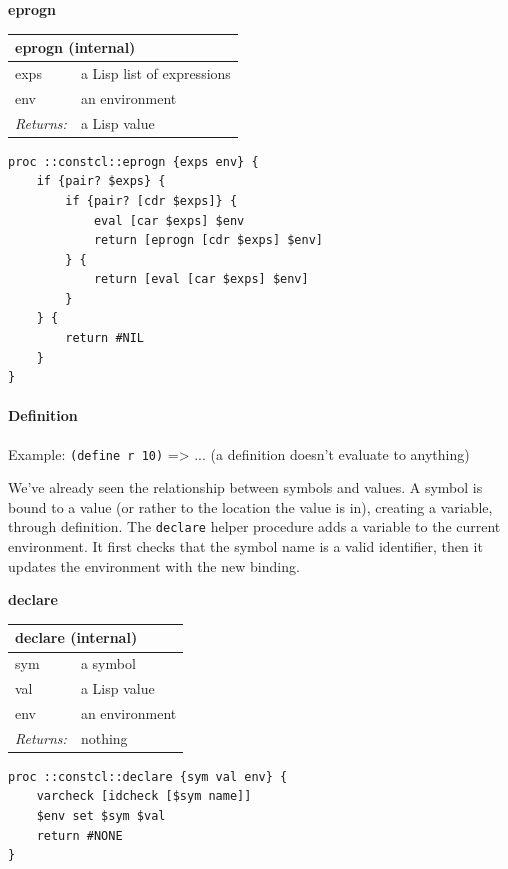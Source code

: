 \documentclass[twoside,9pt]{report}
\begin{document}
\textbf{eprogn}

\begin{tabular}{ |l l| }
\hline
\multicolumn{2}{|l|}{eprogn (internal)} \\
\hline
exps & a Lisp list of expressions \\
env & an environment \\
\textit{Returns:} & a Lisp value \\
\hline
\end{tabular}

\noindent\makebox[\linewidth]{\rule{\linewidth}{0.4pt}}
\begin{lstlisting}
proc ::constcl::eprogn {exps env} {
    if {pair? $exps} {
        if {pair? [cdr $exps]} {
            eval [car $exps] $env
            return [eprogn [cdr $exps] $env]
        } {
            return [eval [car $exps] $env]
        }
    } {
        return #NIL
    }
}
\end{lstlisting}
\noindent\makebox[\linewidth]{\rule{\linewidth}{0.4pt}}
\paragraph{Definition}
\label{definition}

Example: \texttt{(define r 10)} => ... (a definition doesn't evaluate to anything)

We've already seen the relationship between symbols and values. A symbol is bound to a value (or rather to the location the value is in), creating a variable, through definition. The \texttt{declare} helper procedure adds a variable to the current environment. It first checks that the symbol name is a valid identifier, then it updates the environment with the new binding.

\textbf{declare}

\begin{tabular}{ |l l| }
\hline
\multicolumn{2}{|l|}{declare (internal)} \\
\hline
sym & a symbol \\
val & a Lisp value \\
env & an environment \\
\textit{Returns:} & nothing \\
\hline
\end{tabular}

\noindent\makebox[\linewidth]{\rule{\linewidth}{0.4pt}}
\begin{lstlisting}
proc ::constcl::declare {sym val env} {
    varcheck [idcheck [$sym name]]
    $env set $sym $val
    return #NONE
}
\end{lstlisting}
\noindent\makebox[\linewidth]{\rule{\linewidth}{0.4pt}}
\end{document}
